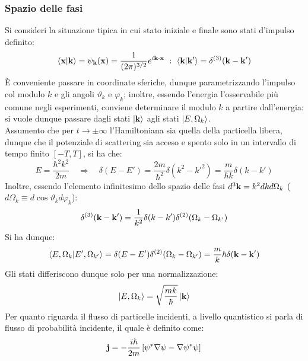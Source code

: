 \subsubsection{Spazio delle fasi}

Si consideri la situazione tipica in cui stato iniziale e finale sono stati d'impulso definito:
\begin{equation*}
	\braket{\mathbf{x} | \mathbf{k}} = \psi_{\mathbf{k}}(\mathbf{x}) = \frac{1}{(2\pi)^{3/2}} e^{i \mathbf{k} \cdot \mathbf{x}} \,\, : \,\, \braket{\mathbf{k} | \mathbf{k}'} = \delta^{(3)}(\mathbf{k} - \mathbf{k}')
\end{equation*}
È conveniente passare in coordinate sferiche, dunque parametrizzando l'impulso col modulo $ k $ e gli angoli $ \vartheta_k $ e $ \varphi_k $; inoltre, essendo l'energia l'osservabile più comune negli esperimenti, conviene determinare il modulo $ k $ a partire dall'energia: si vuole dunque passare dagli stati $ \ket{\mathbf{k}} $ agli stati $ \ket{E, \Omega_k} $.\\
Assumento che per $ t \rightarrow \pm \infty $ l'Hamiltoniana sia quella della particella libera, dunque che il potenziale di scattering sia acceso e spento solo in un intervallo di tempo finito $ [-T, T] $, si ha che:
\begin{equation*}
	E = \frac{\hbar^2 k^2}{2m}
	\quad \Rightarrow \quad
	\delta (E - E') = \frac{2m}{\hbar^2} \delta(k^2 - k'^2) = \frac{m}{\hbar k} \delta(k - k')
\end{equation*}
Inoltre, essendo l'elemento infinitesimo dello spazio delle fasi $ d^3\mathbf{k} = k^2 dk d \Omega_k $ ($ d\Omega_k \equiv d \cos \vartheta_k d \varphi_k $):
\begin{equation*}
	\delta^{(3)}(\mathbf{k} - \mathbf{k}') = \frac{1}{k^2} \delta(k - k') \delta^{(2)}(\Omega_k - \Omega_{k'})
\end{equation*}
Si ha dunque:
\begin{equation*}
	\braket{E, \Omega_k | E', \Omega_{k'}} = \delta(E - E') \delta^{(2)}(\Omega_k - \Omega_{k'}) = \frac{m}k{\hbar} \delta(\mathbf{k} - \mathbf{k}')
\end{equation*}
Gli stati differiscono dunque solo per una normalizzazione:
\begin{equation}
	\ket{E, \Omega_k} = \sqrt{\frac{mk}{\hbar}} \ket{\mathbf{k}}
	\label{eq:5.28}
\end{equation}
Per quanto riguarda il flusso di particelle incidenti, a livello quantistico si parla di flusso di probabilità incidente, il quale è definito come:
\begin{equation}
	\mathbf{j} = - \frac{i\hbar}{2m} \left[ \psi^* \nabla \psi - \nabla \psi^* \psi \right]
	\label{eq:5.29}
\end{equation}
